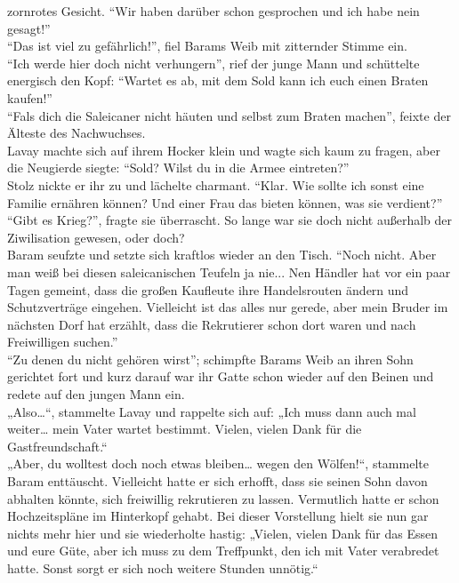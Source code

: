 zornrotes Gesicht. ``Wir haben darüber schon gesprochen und ich habe nein gesagt!''\\
``Das ist viel zu gefährlich!'', fiel Barams Weib mit zitternder Stimme ein.\\
``Ich werde hier doch nicht verhungern'', rief der junge Mann und schüttelte energisch den Kopf: 
``Wartet es ab, mit dem Sold kann ich euch einen Braten kaufen!''\\
``Fals dich die Saleicaner nicht häuten und selbst zum Braten machen'', feixte der Älteste des 
Nachwuchses.\\
Lavay machte sich auf ihrem Hocker klein und wagte sich kaum zu fragen, aber die Neugierde siegte: 
``Sold? Wilst du in die Armee eintreten?''\\
Stolz nickte er ihr zu und lächelte charmant. ``Klar. Wie sollte ich sonst eine Familie ernähren 
können? Und einer Frau das bieten können, was sie verdient?''\\
``Gibt es Krieg?'', fragte sie überrascht. So lange war sie doch nicht außerhalb der Ziwilisation 
gewesen, oder doch?\\
Baram seufzte und setzte sich kraftlos wieder an den Tisch. ``Noch nicht. Aber man weiß bei diesen 
saleicanischen Teufeln ja nie... Nen Händler hat vor ein paar Tagen gemeint, dass die großen 
Kaufleute ihre Handelsrouten ändern und Schutzverträge eingehen. Vielleicht ist das alles nur 
gerede, aber mein Bruder im nächsten Dorf hat erzählt, dass die Rekrutierer schon dort waren und 
nach Freiwilligen suchen.''\\
``Zu denen du nicht gehören wirst''; schimpfte Barams Weib an ihren Sohn gerichtet fort und kurz 
darauf war ihr Gatte schon wieder auf den Beinen und redete auf den jungen Mann ein.\\
„Also…“, stammelte Lavay und rappelte sich auf: „Ich muss dann auch mal weiter… mein Vater wartet 
bestimmt. Vielen, vielen Dank für die Gastfreundschaft.“\\
„Aber, du wolltest doch noch etwas bleiben… wegen den Wölfen!“, stammelte Baram enttäuscht. 
Vielleicht hatte er sich erhofft, dass sie seinen Sohn davon abhalten könnte, sich freiwillig 
rekrutieren zu lassen. Vermutlich hatte er schon Hochzeitspläne im Hinterkopf gehabt. Bei dieser 
Vorstellung hielt sie nun gar nichts mehr hier und sie wiederholte hastig: „Vielen, vielen Dank für 
das Essen und eure Güte, aber ich muss zu dem Treffpunkt, den ich mit Vater verabredet hatte. Sonst 
sorgt er sich noch weitere Stunden unnötig.“\\
